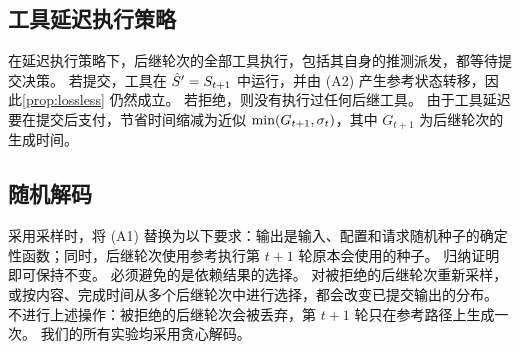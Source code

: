 \subsection{工具延迟执行策略}
\label{app:proofs:deferred}

在延迟执行策略下，后继轮次的全部工具执行，包括其自身的推测派发，都等待提交决策。
若提交，工具在 $\hat S'=S_{t+1}$ 中运行，并由 (A2) 产生参考状态转移，因此\cref{prop:lossless} 仍然成立。
若拒绝，则没有执行过任何后继工具。
由于工具延迟要在提交后支付，节省时间缩减为近似 $\min(G_{t+1},\sigma_t)$，其中 $G_{t+1}$ 为后继轮次的生成时间。

\subsection{随机解码}
\label{app:proofs:stochastic}

采用采样时，将 (A1) 替换为以下要求：输出是输入、配置和请求随机种子的确定性函数；同时，后继轮次使用参考执行第 $t{+}1$ 轮原本会使用的种子。
归纳证明即可保持不变。
必须避免的是依赖结果的选择。
对被拒绝的后继轮次重新采样，或按内容、完成时间从多个后继轮次中进行选择，都会改变已提交输出的分布。
\method 不进行上述操作：被拒绝的后继轮次会被丢弃，第 $t{+}1$ 轮只在参考路径上生成一次。
我们的所有实验均采用贪心解码。
